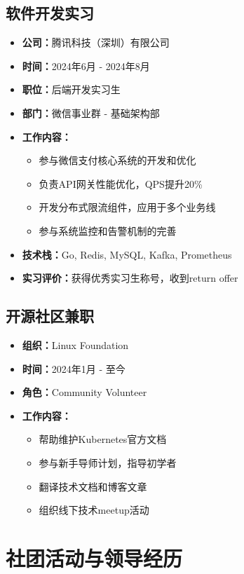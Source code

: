 \documentclass[a4paper,12pt]{article}
\begin{document}
\subsection{软件开发实习}
\begin{itemize}
    \item \textbf{公司：}腾讯科技（深圳）有限公司
    \item \textbf{时间：}2024年6月 - 2024年8月
    \item \textbf{职位：}后端开发实习生
    \item \textbf{部门：}微信事业群 - 基础架构部
    \item \textbf{工作内容：}
    \begin{itemize}
        \item 参与微信支付核心系统的开发和优化
        \item 负责API网关性能优化，QPS提升20\%
        \item 开发分布式限流组件，应用于多个业务线
        \item 参与系统监控和告警机制的完善
    \end{itemize}
    \item \textbf{技术栈：}Go, Redis, MySQL, Kafka, Prometheus
    \item \textbf{实习评价：}获得优秀实习生称号，收到return offer
\end{itemize}

\subsection{开源社区兼职}
\begin{itemize}
    \item \textbf{组织：}Linux Foundation
    \item \textbf{时间：}2024年1月 - 至今
    \item \textbf{角色：}Community Volunteer
    \item \textbf{工作内容：}
    \begin{itemize}
        \item 帮助维护Kubernetes官方文档
        \item 参与新手导师计划，指导初学者
        \item 翻译技术文档和博客文章
        \item 组织线下技术meetup活动
    \end{itemize}
\end{itemize}

\section{社团活动与领导经历}
\end{document}
